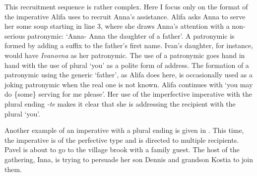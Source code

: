 \documentclass[output=paper,modfonts,nonflat]{langsci/langscibook}
\begin{document}
This recruitment sequence is rather complex. Here I focus only on the format of the imperative Alifa uses to recruit Anna’s assistance. Alifa asks Anna to serve her some soup starting in line 3, where she draws Anna's attention with a non-serious patronymic: ‘Anna- Anna the daughter of a father’. A patronymic is formed by adding a suffix to the father's first name. Ivan's daughter, for instance, would have \textit{Ivanovna} as her patronymic. The use of a patronymic goes hand in hand with the use of plural ‘you’ as a polite form of address. The formation of a patronymic using the generic ‘father’, as Alifa does here, is occasionally used as a joking patronymic when the real one is not known. Alifa continues with ‘you may do \{some\} serving for me please’. Her use of the imperfective imperative with the plural ending \textit{-te} makes it clear that she is addressing the recipient with the plural ‘you’.

Another example of an imperative with a plural ending is given in . This time, the imperative is of the perfective type and is directed to multiple recipients. Pavel is about to go to the village brook with a family guest. The host of the gathering, Inna, is trying to persuade her son Dennis and grandson Kostia to join them.
\end{document}
